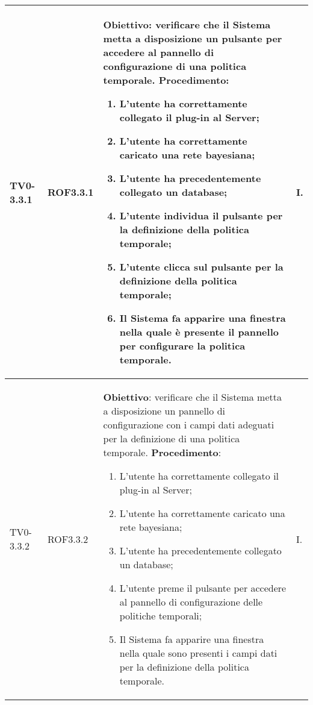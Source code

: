 \begin{longtable}{|C{.15\textwidth}|C{.13\textwidth}|m{.52\textwidth}|C{.08\textwidth}|}
TV0-3.3.1 & ROF3.3.1 &
	\textbf{Obiettivo}: verificare che il Sistema metta a disposizione un pulsante per accedere al pannello di configurazione di una politica temporale. \newline
	\textbf{Procedimento}:
	\begin{enumerate}
		\item L'utente ha correttamente collegato il plug-in al Server;
		\item L'utente ha correttamente caricato una rete bayesiana;
		\item L'utente ha precedentemente collegato un database;
		\item L'utente individua il pulsante per la definizione della politica temporale;
		\item L'utente clicca sul pulsante per la definizione della politica temporale;
		\item Il Sistema fa apparire una finestra nella quale è presente il pannello per configurare la politica temporale.
	\end{enumerate}
	& I. \\
\hline

TV0-3.3.2 & ROF3.3.2 &
	\textbf{Obiettivo}: verificare che il Sistema metta a disposizione un pannello di configurazione con i campi dati adeguati per la definizione di una politica temporale. \newline
	\textbf{Procedimento}:
	\begin{enumerate}
		\item L'utente ha correttamente collegato il plug-in al Server;
		\item L'utente ha correttamente caricato una rete bayesiana;
		\item L'utente ha precedentemente collegato un database;
		\item L'utente preme il pulsante per accedere al pannello di configurazione delle politiche temporali;
		\item Il Sistema fa apparire una finestra nella quale sono presenti i campi dati per la definizione della politica temporale.
	\end{enumerate}
	& I. \\
\hline


\end{longtable}
